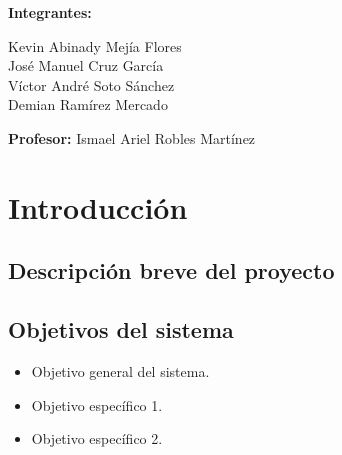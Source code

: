 \documentclass[12pt,letterpaper]{article}
\begin{document}
\begin{titlepage}
    {\large \textbf{Integrantes:} \par}
    \vspace{0.3cm}
    {\large
        Kevin Abinady Mejía Flores\\
        José Manuel Cruz García\\
        Víctor André Soto Sánchez \\
        Demian Ramírez Mercado \\
    \par}
    
    \vfill %
    
    {\large \textbf{Profesor:} Ismael Ariel Robles Martínez \par}
    \vspace{0.5cm}
    
    \vspace{1cm} %
\end{titlepage}
\section{Introducción}

\subsection{Descripción breve del proyecto}

\subsection{Objetivos del sistema}
\begin{itemize}[label=•]
    \item Objetivo general del sistema.
    \item Objetivo específico 1.
    \item Objetivo específico 2.
\end{itemize}

\newpage
\end{document}
